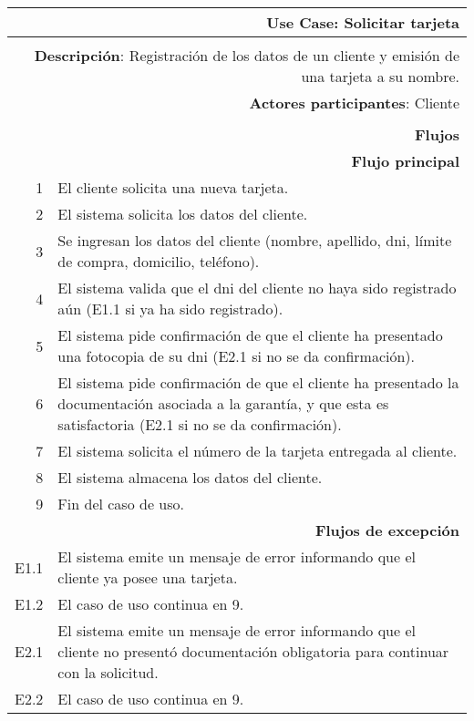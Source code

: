 \begin{tabularx}{\textwidth}{| r | X |}
\hline
\multicolumn{2}{|X|}{
\textbf{Use Case}: Solicitar tarjeta} \\

\hline
\multicolumn{2}{|c|}{\cellcolor[gray]{0.6}} \\

\hline
\multicolumn{2}{|X|}{
\textbf{Descripción}: Registración de los datos de un cliente y emisión de una
tarjeta a su nombre.} \\

\hline
\multicolumn{2}{|X|}{
\textbf{Actores participantes}: Cliente} \\

\hline
\multicolumn{2}{|c|}{\cellcolor[gray]{0.6} } \\

\hline
\multicolumn{2}{|X|}{
\textbf{Flujos}} \\

\hline
\multicolumn{2}{|X|}{
\textbf{Flujo principal}} \\

\hline
1 & El cliente solicita una nueva tarjeta. \\
\hline
2 & El sistema solicita los datos del cliente. \\
\hline
3 & Se ingresan los datos del cliente (nombre, apellido, dni, límite de compra,
domicilio, teléfono). \\
\hline
4 & El sistema valida que el dni del cliente no haya sido registrado aún (E1.1
si ya ha sido registrado). \\
\hline
5 & El sistema pide confirmación de que el cliente ha presentado una fotocopia
de su dni (E2.1 si no se da confirmación). \\
\hline
6 & El sistema pide confirmación de que el cliente ha presentado la
documentación asociada a la garantía, y que esta es satisfactoria (E2.1 si no se
da confirmación). \\
\hline
7 & El sistema solicita el número de la tarjeta entregada al cliente. \\
\hline
8 & El sistema almacena los datos del cliente. \\
\hline
9 & Fin del caso de uso. \\

\hline
\multicolumn{2}{|X|}{
\textbf{Flujos de excepción}} \\

\hline
E1.1 & El sistema emite un mensaje de error informando que el cliente ya posee
una tarjeta. \\
\hline
E1.2 & El caso de uso continua en 9.\\

\hline
E2.1 & El sistema emite un mensaje de error informando que el cliente no
presentó documentación obligatoria para continuar con la solicitud. \\
\hline
E2.2 & El caso de uso continua en 9. \\

\hline
\end{tabularx}

